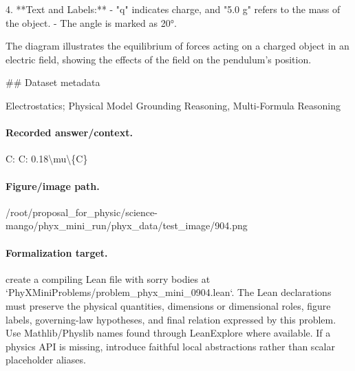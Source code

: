 4. **Text and Labels:**
   - "q" indicates charge, and "5.0 g" refers to the mass of the object.
   - The angle is marked as 20°.

The diagram illustrates the equilibrium of forces acting on a charged object in an electric field, showing the effects of the field on the pendulum's position.

\#\# Dataset metadata

Electrostatics; Physical Model Grounding Reasoning, Multi-Formula Reasoning

\paragraph{Recorded answer/context.}
C: C: 0.18\textbackslash{}mu\textbackslash{}\{C\}

\paragraph{Figure/image path.}
/root/proposal\_for\_physic/science-mango/phyx\_mini\_run/phyx\_data/test\_image/904.png

\paragraph{Formalization target.}
create a compiling Lean file with sorry bodies at `PhyXMiniProblems/problem\_phyx\_mini\_0904.lean`. The Lean declarations must preserve the physical quantities, dimensions or dimensional roles, figure labels, governing-law hypotheses, and final relation expressed by this problem.
Use Mathlib/Physlib names found through LeanExplore where available. If a physics API is missing, introduce faithful local abstractions rather than scalar placeholder aliases.

